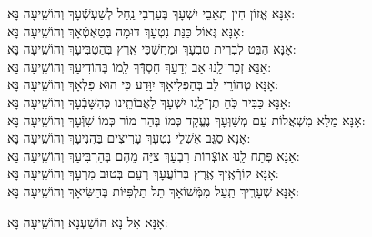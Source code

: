 \documentclass[twoside, openany, parskip=half, 11pt]{book}
\begin{document}
\begin{small}
אָנָּא 	אֱזוֹן חִין תְּאֵבֵי יִשְׁעָךְ בְּעַרְבֵי נַֽחַל לְשַׁעְשְֿׁעָךְ 		\hfill		וְהוֹשִֽׁיעָה נָּא:\\
אָנָּא 	גְּאוֹל כַּנַּת נִטְעָךְ דּוּמָה בְּטַאְטְֿאָךְ 			\hfill		וְהוֹשִֽׁיעָה נָּא:\\
אָנָּא הַבֵּט לִבְרִית טִבְעָךְ וּמַחֲשַׁכֵּי אֶֽרֶץ בְּהַטְבִּיעָךְ 	\hfill		וְהוֹשִֽׁיעָה נָּא:\\
אָנָּא 	זְכָר־לָֽנוּ אָב יְדָעָךְ חַסְדְּֿךָ לָֽמוֹ בְּהוֹדִיעָךְ 		\hfill		וְהוֹשִֽׁיעָה נָּא:\\
אָנָּא 	טְהוֹרֵי לֵב בְּהַפְלִיאָךְ יִוָּדַע כִּי הוּא פִלְאָךְ 		\hfill		וְהוֹשִֽׁיעָה נָּא:\\
אָנָּא 	כַּבִּיר כֹּֽחַ תֶּן־לָֽנוּ יִשְׁעָךְ לַאֲבוֹתֵֽינוּ כְּהִשָּׁבְֿעָךְ 		\hfill		וְהוֹשִֽׁיעָה נָּא:\\
אָנָּא 	מַלֵּא מִשְׁאֲלוֹת עַם מְשַׁוְּעָךְ נֶעֱקָד כְּמוֹ בְּהַר מוֹר כְּמוֹ שִׁוְּֿעָךְ \hfill		וְהוֹשִֽׁיעָה נָּא:\\
אָנָּא 	סַגֵּב אֶשְׁלֵי נִטְעָךְ עָרִיצִים בַּהֲנִיעָךְ 			\hfill		וְהוֹשִֽׁיעָה נָּא:\\
אָנָּא 	פְּתַח לָֽנוּ אוֹצְֿרוֹת רִבְעָךְ צִיָּה מֵהֶם בְּהַרְבִּיעָךְ 	\hfill		וְהוֹשִֽׁיעָה נָּא:\\
אָנָּא 	קוֹרְֿאֶֽיךָ אֶֽרֶץ בְּרוֹעֲעָךְ רְעֵם בְּטוּב מִרְעָךְ 		\hfill		וְהוֹשִֽׁיעָה נָּא:\\
אָנָּא 	שְׁעָרֶֽיךָ תַּֽעַל מִמְּֿשׁוֹאָךְ תֵּל תַּלְפִּיּוֹת בְּהַשִּׂיאָךְ 	\hfill		וְהוֹשִֽׁיעָה נָּא:

\end{small}

\begin{large}
 אָנָּא אֵל נָא הוֹשַׁעְנָא וְהוֹשִֽׁיעָה נָּא:

\end{large}
\end{document}
